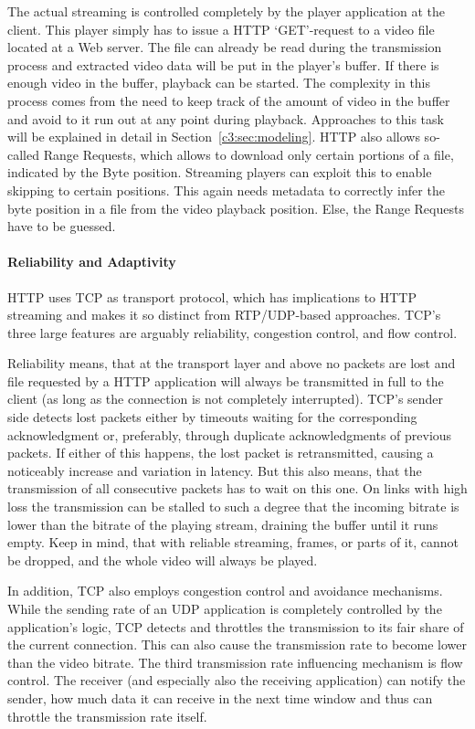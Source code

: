 The actual streaming is controlled completely by the player application at the client. This player simply has to issue a \gls{HTTP} `GET'-request to a video file located at a Web server. The file can already be read during the transmission process and extracted video data will be put in the player's buffer. If there is enough video in the buffer, playback can be started. The complexity in this process comes from the need to keep track of the amount of video in the buffer and avoid to it run out at any point during playback. Approaches to this task will be explained in detail in Section~\ref{c3:sec:modeling}. \gls{HTTP} also allows so-called Range Requests, which allows to download only certain portions of a file, indicated by the Byte position. Streaming players can exploit this to enable skipping to certain positions. This again needs metadata to correctly infer the byte position in a file from the video playback position. Else, the Range Requests have to be guessed. 

\paragraph{Reliability and Adaptivity}

\gls{HTTP} uses \gls{TCP} as transport protocol, which has implications to \gls{HTTP} streaming and makes it so distinct from \gls{RTP}/\gls{UDP}-based approaches. \gls{TCP}'s three large features are arguably reliability, congestion control, and flow control.

Reliability means, that at the transport layer and above no packets are lost and file requested by a \gls{HTTP} application will always be transmitted in full to the client (as long as the connection is not completely interrupted). \gls{TCP}'s sender side detects lost packets either by timeouts waiting for the corresponding acknowledgment or, preferably, through duplicate acknowledgments of previous packets. If either of this happens, the lost packet is retransmitted, causing a noticeably increase and variation in latency. But this also means, that the transmission of all consecutive packets has to wait on this one. On links with high loss the transmission can be stalled to such a degree that the incoming bitrate is lower than the bitrate of the playing stream, draining the buffer until it runs empty. Keep in mind, that with reliable streaming, frames, or parts of it, cannot be dropped, and the whole video will always be played.

In addition, \gls{TCP} also employs congestion control and avoidance mechanisms. While the sending rate of an \gls{UDP} application is completely controlled by the application's logic, \gls{TCP} detects and throttles the transmission to its fair share of the current connection. This can also cause the transmission rate to become lower than the video bitrate. The third transmission rate influencing mechanism is flow control. The receiver (and especially also the receiving application) can notify the sender, how much data it can receive in the next time window and thus can throttle the transmission rate itself.

